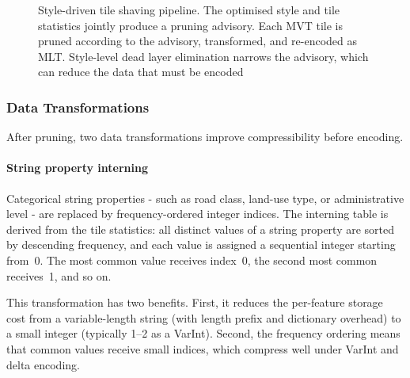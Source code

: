 \begin{figure}[htbp]
    \caption{Style-driven tile shaving pipeline.  The optimised style and tile statistics jointly produce a pruning advisory.  Each \ac{MVT} tile is pruned according to the advisory, transformed, and re-encoded as \ac{MLT}.  Style-level dead layer elimination narrows the advisory, which can reduce the data that must be encoded}
    \label{fig:tile_shaving_pipeline}
\end{figure}

\subsubsection{Data Transformations}\label{sub_data_transforms}

After pruning, two data transformations improve compressibility before encoding.

\paragraph{String property interning}
Categorical string properties - such as road class, land-use type, or administrative level - are replaced by frequency-ordered integer indices.
The interning table is derived from the tile statistics: all distinct values of a string property are sorted by descending frequency, and each value is assigned a sequential integer starting from~0.
The most common value receives index~0, the second most common receives~1, and so on.

This transformation has two benefits.
First, it reduces the per-feature storage cost from a variable-length string (with length prefix and dictionary overhead) to a small integer (typically \qtyrange{1}{2}{\byte} as a \ac{VarInt}).
Second, the frequency ordering means that common values receive small indices, which compress well under \ac{VarInt} and delta encoding.

